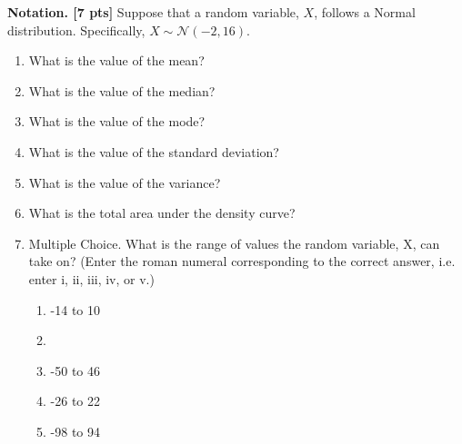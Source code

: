 

\item \textbf{Notation.  [7 pts]} Suppose that a random variable, $X$, follows a Normal distribution. Specifically, $X \sim \mathcal{N}(-2, 16)$. 
\begin{enumerate}
\item What is the value of the mean?  
\item What is the value of the median? 
\item What is the value of the mode? 
\item What is the value of the standard deviation?  
\item What is the value of the variance?   
\item What is the total area under the density curve?  
\item Multiple Choice.  What is the range of values the random variable, X, can take on?  (Enter the roman numeral corresponding to the correct answer, i.e. enter i, ii, iii, iv, or v.)
\begin{enumerate}
\item -14 to 10
\item {}
\item -50 to 46
\item -26 to 22
\item -98 to 94
\end{enumerate}
\end{enumerate}